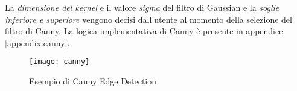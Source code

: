 La \textit{dimensione del kernel} e il valore \textit{sigma} del filtro di Gaussian e la \textit{soglie inferiore e superiore} vengono decisi dall'utente al momento della selezione del filtro di Canny. \newline\newline
\noindent La logica implementativa di Canny è presente in appendice: \ref{appendix:canny}.
\begin{figure}[H]
	\centering
	\texttt{[image: canny]}
	\caption{Esempio di Canny Edge Detection}
\end{figure}